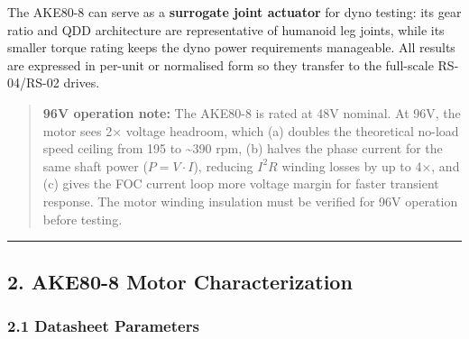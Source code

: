 \documentclass[
]{article}
\begin{document}
The AKE80-8 can serve as a \textbf{surrogate joint actuator} for dyno
testing: its gear ratio and QDD architecture are representative of
humanoid leg joints, while its smaller torque rating keeps the dyno
power requirements manageable. All results are expressed in per-unit or
normalised form so they transfer to the full-scale RS-04/RS-02 drives.

\begin{quote}
\textbf{96V operation note:} The AKE80-8 is rated at 48V nominal. At
96V, the motor sees 2× voltage headroom, which (a) doubles the
theoretical no-load speed ceiling from 195 to \textasciitilde390 rpm,
(b) halves the phase current for the same shaft power
(\(P = V \cdot I\)), reducing \(I^2 R\) winding losses by up to 4×, and
(c) gives the FOC current loop more voltage margin for faster transient
response. The motor winding insulation must be verified for 96V
operation before testing.
\end{quote}

\begin{center}\rule{0.5\linewidth}{0.5pt}\end{center}

\subsection{2. AKE80-8 Motor
Characterization}\label{ake80-8-motor-characterization}

\subsubsection{2.1 Datasheet Parameters}\label{datasheet-parameters}
\end{document}
